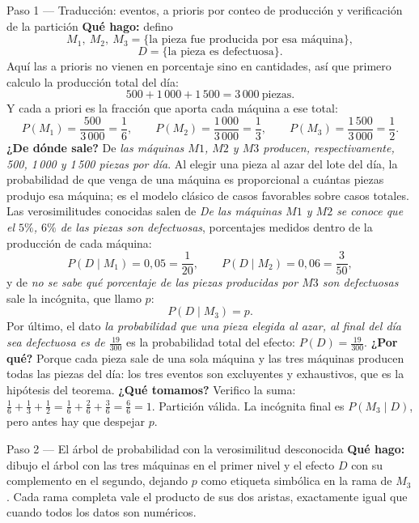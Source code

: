 \documentclass[11pt]{article}
\begin{document}
\begin{sol}

\begin{paso}{Paso 1 --- Traducción: eventos, a prioris por conteo de producción y verificación de la partición}
\textbf{Qué hago:} defino
\[
M_1,\ M_2,\ M_3=\{\text{la pieza fue producida por esa máquina}\},
\]
\[
D=\{\text{la pieza es defectuosa}\}.
\]
Aquí las a prioris no vienen en porcentaje sino en cantidades, así que primero calculo la producción total del día:
\[
500+1\,000+1\,500=3\,000\ \text{piezas}.
\]
Y cada a priori es la fracción que aporta cada máquina a ese total:
\[
P(M_1)=\frac{500}{3\,000}=\frac16,\qquad P(M_2)=\frac{1\,000}{3\,000}=\frac13,\qquad P(M_3)=\frac{1\,500}{3\,000}=\frac12 .
\]
\textbf{¿De dónde sale?} De \emph{las máquinas $M1$, $M2$ y $M3$ producen, respectivamente, 500, 1\,000 y 1\,500 piezas por día}. Al elegir una pieza al azar del lote del día, la probabilidad de que venga de una máquina es proporcional a cuántas piezas produjo esa máquina; es el modelo clásico de casos favorables sobre casos totales.
Las verosimilitudes conocidas salen de \emph{De las máquinas $M1$ y $M2$ se conoce que el $5\%$, $6\%$ de las piezas son defectuosas}, porcentajes medidos dentro de la producción de cada máquina:
\[
P(D\mid M_1)=0,05=\frac{1}{20},\qquad P(D\mid M_2)=0,06=\frac{3}{50},
\]
y de \emph{no se sabe qué porcentaje de las piezas producidas por $M3$ son defectuosas} sale la incógnita, que llamo $p$:
\[
P(D\mid M_3)=p .
\]
Por último, el dato \emph{la probabilidad que una pieza elegida al azar, al final del día sea defectuosa es de $\tfrac{19}{300}$} es la probabilidad total del efecto: $P(D)=\tfrac{19}{300}$.
\textbf{¿Por qué?} Porque cada pieza sale de una sola máquina y las tres máquinas producen todas las piezas del día: los tres eventos son excluyentes y exhaustivos, que es la hipótesis del teorema.
\textbf{¿Qué tomamos?} Verifico la suma: $\tfrac16+\tfrac13+\tfrac12=\tfrac{1}{6}+\tfrac{2}{6}+\tfrac{3}{6}=\tfrac66=1$. Partición válida. La incógnita final es $P(M_3\mid D)$, pero antes hay que despejar $p$.
\end{paso}

\begin{paso}{Paso 2 --- El árbol de probabilidad con la verosimilitud desconocida}
\textbf{Qué hago:} dibujo el árbol con las tres máquinas en el primer nivel y el efecto $D$ con su complemento en el segundo, dejando $p$ como etiqueta simbólica en la rama de $M_3$. Cada rama completa vale el producto de sus dos aristas, exactamente igual que cuando todos los datos son numéricos.


\end{paso}
\end{sol}
\end{document}
